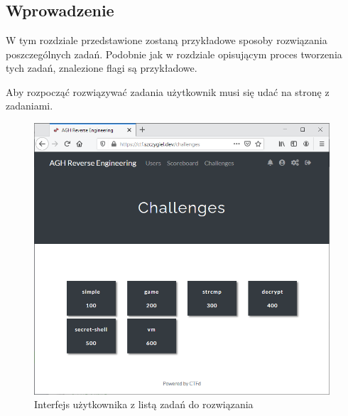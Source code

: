 \documentclass[polish,12pt]{aghthesis}
\begin{document}
\clearpage

\section{\SectionTitleResults}
\label{sec:wyniki-projektu}

\subsection{Wprowadzenie}

W tym rozdziale przedstawione zostaną przykładowe sposoby rozwiązania poszczególnych zadań.
Podobnie jak w rozdziale opisującym proces tworzenia tych zadań, znalezione
flagi są przykładowe.

Aby rozpocząć rozwiązywać zadania użytkownik musi się udać na stronę z zadaniami.

\begin{figure}[H]
    \centering
    \includegraphics[width=11cm]{ui_challenges}
    \caption{Interfejs użytkownika z listą zadań do rozwiązania}
    \label{fig:ui_challenges}
\end{figure}
\end{document}
